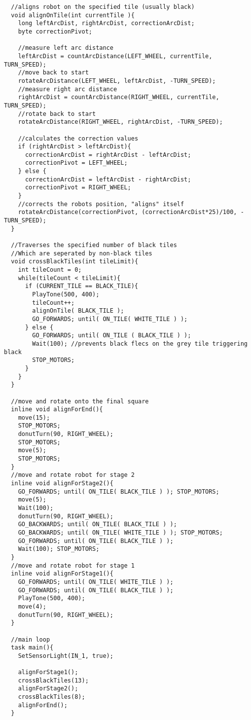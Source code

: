 \documentclass[a4paper,11pt]{article}
\begin{document}
\begin{lstlisting}
  //aligns robot on the specified tile (usually black)
  void alignOnTile(int currentTile ){
    long leftArcDist, rightArcDist, correctionArcDist;
    byte correctionPivot;

    //measure left arc distance
    leftArcDist = countArcDistance(LEFT_WHEEL, currentTile, TURN_SPEED);
    //move back to start
    rotateArcDistance(LEFT_WHEEL, leftArcDist, -TURN_SPEED);
    //measure right arc distance
    rightArcDist = countArcDistance(RIGHT_WHEEL, currentTile, TURN_SPEED);
    //rotate back to start
    rotateArcDistance(RIGHT_WHEEL, rightArcDist, -TURN_SPEED);

    //calculates the correction values
    if (rightArcDist > leftArcDist){
      correctionArcDist = rightArcDist - leftArcDist;
      correctionPivot = LEFT_WHEEL;
    } else {
      correctionArcDist = leftArcDist - rightArcDist;
      correctionPivot = RIGHT_WHEEL;
    }
    //corrects the robots position, "aligns" itself
    rotateArcDistance(correctionPivot, (correctionArcDist*25)/100, -TURN_SPEED);
  }

  //Traverses the specified number of black tiles
  //Which are seperated by non-black tiles
  void crossBlackTiles(int tileLimit){
    int tileCount = 0;
    while(tileCount < tileLimit){
      if (CURRENT_TILE == BLACK_TILE){
        PlayTone(500, 400);
        tileCount++;
        alignOnTile( BLACK_TILE );
        GO_FORWARDS; until( ON_TILE( WHITE_TILE ) );
      } else {
        GO_FORWARDS; until( ON_TILE ( BLACK_TILE ) );
        Wait(100); //prevents black flecs on the grey tile triggering black
        STOP_MOTORS;
      }
    }
  }

  //move and rotate onto the final square
  inline void alignForEnd(){
    move(15);
    STOP_MOTORS;
    donutTurn(90, RIGHT_WHEEL);
    STOP_MOTORS;
    move(5);
    STOP_MOTORS;
  }
  //move and rotate robot for stage 2
  inline void alignForStage2(){
    GO_FORWARDS; until( ON_TILE( BLACK_TILE ) ); STOP_MOTORS;
    move(5);
    Wait(100);
    donutTurn(90, RIGHT_WHEEL);
    GO_BACKWARDS; until( ON_TILE( BLACK_TILE ) );
    GO_BACKWARDS; until( ON_TILE( WHITE_TILE ) ); STOP_MOTORS;
    GO_FORWARDS; until( ON_TILE( BLACK_TILE ) );
    Wait(100); STOP_MOTORS;
  }
  //move and rotate robot for stage 1
  inline void alignForStage1(){
    GO_FORWARDS; until( ON_TILE( WHITE_TILE ) );
    GO_FORWARDS; until( ON_TILE( BLACK_TILE ) );
    PlayTone(500, 400);
    move(4);
    donutTurn(90, RIGHT_WHEEL);
  }

  //main loop
  task main(){
    SetSensorLight(IN_1, true);

    alignForStage1();
    crossBlackTiles(13);
    alignForStage2();
    crossBlackTiles(8);
    alignForEnd();
  }
\end{lstlisting}
\end{document}
